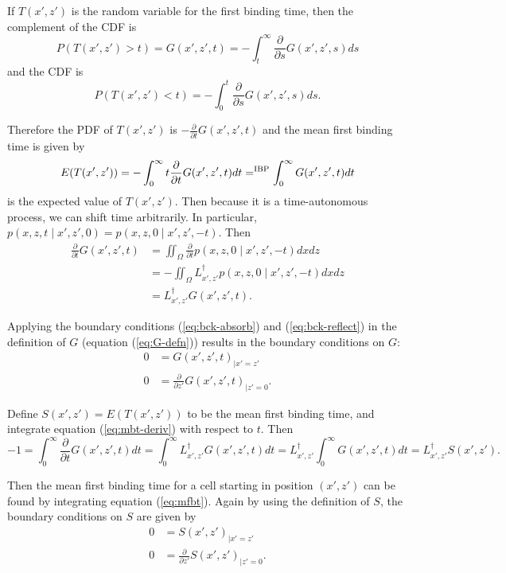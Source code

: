 \documentclass{article}
\newcommand{\tn}{\textnormal}
\newcommand{\dd}{d}
\newcommand{\Pder}[2]{\frac{\partial #1}{\partial #2}}
\newcommand{\Integral}[4]{\int_{#3}^{#4} {#1} \dd #2}
\begin{document}
If $T(x', z')$ is the random variable for the first binding time, then
the complement of the CDF is
\begin{equation}
  P(T(x', z') > t) = G(x', z', t) = -\Integral{\Pder{}{s} G(x', z',
    s)}{s}{t}{\infty}
  \label{eq:cdf-complement}
\end{equation}
and the CDF is 
\begin{equation}
  P(T(x', z') < t) = -\Integral{\Pder{}{s} G(x', z', s)}{s}{0}{t}.
  \label{eq:cdf}
\end{equation}

Therefore the PDF of $T(x', z')$ is $-\Pder{}{t} G(x', z', t)$ and the
mean first binding time is given by
\begin{equation}
  E(T(x', z')) = -\Integral{t \Pder{}{t} G(x', z', t)}{t}{0}{\infty}
  =^\tn{IBP} \Integral{G(x', z', t)}{t}{0}{\infty}
  \label{eq:expect}
\end{equation}
is the expected value of $T(x', z')$. Then because it is a
time-autonomous process, we can shift time arbitrarily. In particular,
$p(x, z, t \mid x', z', 0) = p(x, z, 0 \mid x', z', -t)$. Then
\begin{align}
  \Pder{}{t} G(x', z', t) &= \iint_\Omega \Pder{}{t} p(x, z, 0 \mid x', z',
  -t) dx dz \\
  &= -\iint_\Omega L^\dag_{x', z'} p(x, z, 0 \mid x', z', -t) dx dz \\
  &= L^\dag_{x', z'} G(x', z', t).
  \label{eq:mbt-deriv}
\end{align}

Applying the boundary conditions (\ref{eq:bck-absorb}) and
(\ref{eq:bck-reflect}) in the definition of $G$ (equation
(\ref{eq:G-defn})) results in the boundary conditions on $G$:
\begin{align}
  \label{eq:G-absorb}
  0 &= G(x', z', t)_{|x' = z'} \\
  \label{eq:G-reflect}
  0 &= \Pder{}{z'}G(x', z', t)_{|z' = 0}.
\end{align}

Define $S(x', z') = E(T(x', z'))$ to be the mean first binding time,
and integrate equation (\ref{eq:mbt-deriv}) with respect to $t$. Then
\begin{equation}
  -1 = \Integral{\Pder{}{t}G(x', z', t)}{t}{0}{\infty}
  = \Integral{L^\dag_{x', z'} G(x', z', t)}{t}{0}{\infty}
  = L^\dag_{x', z'} \Integral{G(x', z', t)}{t}{0}{\infty}
  = L^\dag_{x', z'} S(x', z').
  \label{eq:mfbt}
\end{equation}

Then the mean first binding time for a cell starting in position $(x',
z')$ can be found by integrating equation (\ref{eq:mfbt}). Again by
using the definition of $S$, the boundary conditions on $S$ are given
by
\begin{align}
  \label{eq:S-absorb}
  0 &= S(x', z')_{|x' = z'} \\
  \label{eq:S-reflect}
  0 &= \Pder{}{z'} S(x', z')_{|z'=0}.
\end{align}
\end{document}

